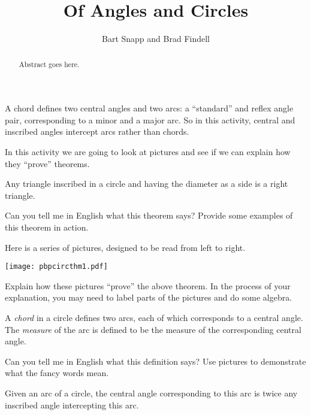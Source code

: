 \documentclass{ximera}
\title{Of Angles and Circles}
\author{Bart Snapp and Brad Findell}
\begin{document}
\begin{abstract}
Abstract goes here.  
\end{abstract}
\maketitle

\begin{teachingnote}
A chord defines two central angles and two arcs: a ``standard'' and reflex angle pair, corresponding to a minor and a major arc.  So in this activity, central and inscribed angles intercept arcs rather than chords.
\end{teachingnote}

In this activity we are going to look at pictures and see if we can
explain how they ``prove'' theorems.

\begin{theorem} 
Any triangle inscribed in a circle and having the diameter as a side is a
right triangle.
\end{theorem}

\begin{problem}
Can you tell me in English what this theorem says? Provide some
examples of this theorem in action.
\end{problem}

\begin{problem} 
Here is a series of pictures, designed to be read from left to right.
\begin{image}
\texttt{[image: pbpcircthm1.pdf]}
\end{image}
Explain how these pictures ``prove'' the above theorem. In the process
of your explanation, you may need to label parts of the pictures and
do some algebra.
\end{problem}

\begin{definition}
A \emph{chord} in a circle defines two {arcs}, each of which corresponds to a {central angle}.  The \emph{measure} of the arc is defined to be the measure of the corresponding central angle.  
\end{definition}

\begin{problem}
Can you tell me in English what this definition says? Use pictures to demonstrate what the fancy words mean.  
\end{problem}

\begin{theorem} 
Given an arc of a circle, the central angle corresponding to this arc is
twice any inscribed angle intercepting this arc.
\end{theorem}
\end{document}
